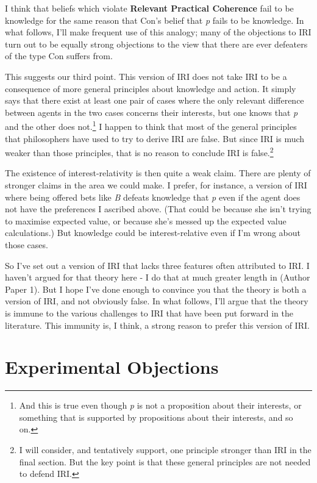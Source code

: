 \documentclass[
  10pt,
  letterpaper,
  DIV=11,
  numbers=noendperiod,
  twoside]{scrartcl}
\begin{document}
I think that beliefs which violate \textbf{Relevant Practical Coherence}
fail to be knowledge for the same reason that Con's belief that \emph{p}
fails to be knowledge. In what follows, I'll make frequent use of this
analogy; many of the objections to IRI turn out to be equally strong
objections to the view that there are ever defeaters of the type Con
suffers from.

This suggests our third point. This version of IRI does not take IRI to
be a consequence of more general principles about knowledge and action.
It simply says that there exist at least one pair of cases where the
only relevant difference between agents in the two cases concerns their
interests, but one knows that \emph{p} and the other does
not.\footnote{And this is true even though \emph{p} is not a proposition
  about their interests, or something that is supported by propositions
  about their interests, and so on.} I happen to think that most of the
general principles that philosophers have used to try to derive IRI are
false. But since IRI is much weaker than those principles, that is no
reason to conclude IRI is false.\footnote{I will consider, and
  tentatively support, one principle stronger than IRI in the final
  section. But the key point is that these general principles are not
  needed to defend IRI.}

The existence of interest-relativity is then quite a weak claim. There
are plenty of stronger claims in the area we could make. I prefer, for
instance, a version of IRI where being offered bets like \emph{B}
defeats knowledge that \emph{p} even if the agent does not have the
preferences I ascribed above. (That could be because she isn't trying to
maximise expected value, or because she's messed up the expected value
calculations.) But knowledge could be interest-relative even if I'm
wrong about those cases.

So I've set out a version of IRI that lacks three features often
attributed to IRI. I haven't argued for that theory here - I do that at
much greater length in (Author Paper 1). But I hope I've done enough to
convince you that the theory is both a version of IRI, and not obviously
false. In what follows, I'll argue that the theory is immune to the
various challenges to IRI that have been put forward in the literature.
This immunity is, I think, a strong reason to prefer this version of
IRI.

\section{Experimental Objections}\label{sect:xphi}
\end{document}
